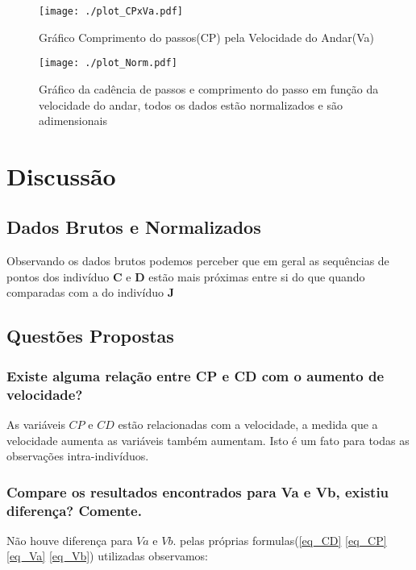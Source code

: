 \documentclass[a4paper,10pt]{article}
\begin{document}
\begin{figure}[h]

 \centering
 \texttt{[image: ./plot\_CPxVa.pdf]}
 \caption{Gráfico Comprimento do passos(CP) pela Velocidade do Andar(Va)}
 \label{plotCPxVa}
\end{figure}

\begin{figure}[h]
 \centering
 \texttt{[image: ./plot\_Norm.pdf]}
 \caption{Gráfico da cadência de passos e comprimento do passo em função da velocidade do andar, todos os dados estão normalizados e são adimensionais}
 \label{plotNorm}
\end{figure}


\FloatBarrier
\section{Discussão}

\subsection{Dados Brutos e Normalizados}
Observando os dados brutos podemos perceber que em geral as sequências de pontos dos indivíduo \textbf{C} e \textbf{D} estão mais próximas entre si do que quando comparadas com a do indivíduo \textbf{J}


\subsection{Questões Propostas}
\subsubsection{Existe alguma relação entre CP e CD com o aumento de velocidade?}
As variáveis $CP$ e $CD$ estão relacionadas com a velocidade, a medida que a velocidade aumenta as variáveis também aumentam. Isto é um fato para todas as observações intra-indivíduos.

\subsubsection{Compare os resultados encontrados para Va e Vb, existiu diferença? Comente.}
Não houve diferença para $Va$ e $Vb$. pelas próprias formulas(\ref{eq_CD} \ref{eq_CP} \ref{eq_Va} \ref{eq_Vb}) utilizadas observamos:
\end{document}
